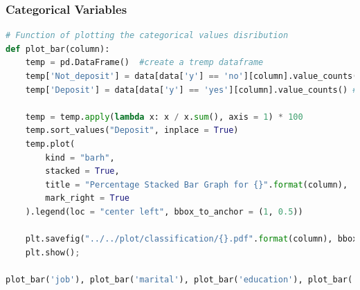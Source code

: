 \documentclass[11pt,a4paper]{article}
\begin{document}
    \subsubsection{Categorical Variables}
\begin{lstlisting}[language = Python]
# Function of plotting the categorical values disribution
def plot_bar(column):
    temp = pd.DataFrame()  #create a tremp dataframe
    temp['Not_deposit'] = data[data['y'] == 'no'][column].value_counts() # count the value when y = no
    temp['Deposit'] = data[data['y'] == 'yes'][column].value_counts() # count the value when y = yes

    temp = temp.apply(lambda x: x / x.sum(), axis = 1) * 100
    temp.sort_values("Deposit", inplace = True)
    temp.plot(
        kind = "barh", 
        stacked = True, 
        title = "Percentage Stacked Bar Graph for {}".format(column), 
        mark_right = True
    ).legend(loc = "center left", bbox_to_anchor = (1, 0.5))

    plt.savefig("../../plot/classification/{}.pdf".format(column), bbox_inches = "tight")
    plt.show();

plot_bar('job'), plot_bar('marital'), plot_bar('education'), plot_bar('contact'), plot_bar('loan'), plot_bar('housing')
\end{lstlisting}
    
\end{document}
